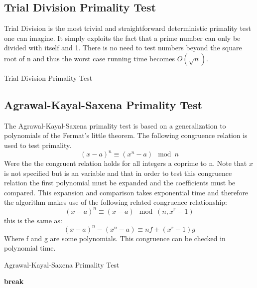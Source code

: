 \documentclass[compressed,final,notitlepage,narroweqnarray,inline,twoside,]{ieee}
\begin{document}
\subsection{Trial Division Primality Test}
Trial Division is the most trivial and straightforward deterministic primality test one can imagine. It simply exploits the fact that a prime number can only be divided with itself and 1. There is no need to test numbers beyond the square root of n and thus the worst case running time becomes $O(\sqrt{n})$.
\begin{algorithm}[ht]
 \caption{Trial Division Primality Test}

 {
	{
		\;
	}
 }
 \;
\end{algorithm}
\subsection{Agrawal-Kayal-Saxena Primality Test}
The Agrawal-Kayal-Saxena primality test \cite{AKS} is based on a generalization to polynomials of the Fermat's little theorem. The following congruence relation is used to test primality. 
\begin{equation}
(x-a)^n \equiv (x^n-a) \mod n
\end{equation}
Were the the congruent relation holds for all integers a coprime to n. Note that $x$ is not specified but is an variable and that in order to test this congruence relation the first polynomial must be expanded and the coefficients must be compared. This expansion and comparison takes exponential time and therefore the algorithm makes use of the following related congruence relationship:
\begin{equation}
(x-a)^n \equiv (x-a) \mod (n,x^r-1)
\end{equation}
this is the same as:
\begin{equation}
(x-a)^n - (x^n-a) \equiv nf + (x^r - 1)g
\end{equation}
Where f and g are some polynomials. This congruence can be checked in polynomial time. 
\begin{algorithm}[ht]
 \caption{Agrawal-Kayal-Saxena Primality Test}
 {
	{
		\;
	}
 }
 {
	{
		\textbf{break}\;
	}
 }
 {
	{
		\;
	}
 }
 {
		\;
 }
 {
	{
		\;
	}
 }
 \;
\end{algorithm}
\end{document}
